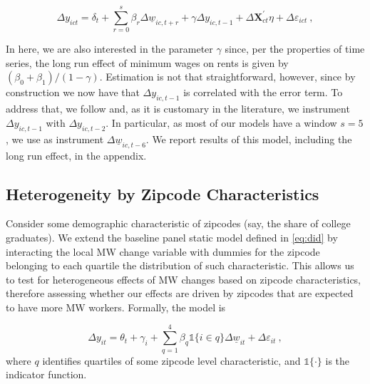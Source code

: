 \begin{equation}\label{eq:ab_panel}
	\Delta y_{ict} = \delta_t
				   + \sum_{r=0}^{s} \beta_r \Delta \underline{w}_{ic,t+r}
				   + \gamma \Delta y_{ic,t-1} + \Delta \mathbf{X}^{'}_{ct}\eta
				   + \Delta \varepsilon_{ict} \ ,
\end{equation}

In here, we are also interested in the parameter $\gamma$ since, per the properties of time
series, the long run effect of minimum wages on rents is given by 
$(\beta_0 + \beta_1)/(1-\gamma)$. %
Estimation is not that straightforward, however, since by construction we now have that 
$\Delta y_{ic,t-1}$ is correlated with the error term. To address that,  we follow 
\textcite{ArellanoBond1991} %
and, as it is customary in the literature, we instrument $\Delta y_{ic,t-1}$ with $\Delta 
y_{ic,t-2}$. In particular, as most of our models have a window $s=5$, we use as instrument 
$\Delta \underline{w}_{ic,t-6}$. We report results of this model, including the long run
effect, in the appendix.

\subsection{Heterogeneity by Zipcode Characteristics}\label{sec:strategy_heterogeneity}

Consider some demographic characteristic of zipcodes (say, the share of college graduates).
We extend the baseline panel static model defined in \autoref{eq:did} by interacting the 
local MW change variable with dummies for the zipcode belonging to each quartile the 
distribution of such characteristic. This allows us to test for heterogeneous effects of MW 
changes based on zipcode characteristics, therefore assessing whether our effects are driven 
by zipcodes that are expected to have more MW workers. Formally, the model is

\begin{equation}\label{eq:diff_main_hetero} 
    \Delta y_{it} = \theta_t + \gamma_i 
    		+ \sum_{q = 1}^4 \beta_q \mathds{1}\{i \in q\} \Delta \underline{w}_{it} 
    		+ \Delta \varepsilon_{it} \ ,
\end{equation}
where $q$ identifies quartiles of some zipcode level characteristic, and $\mathds{1}\{ \cdot \}$ 
is the indicator function.

